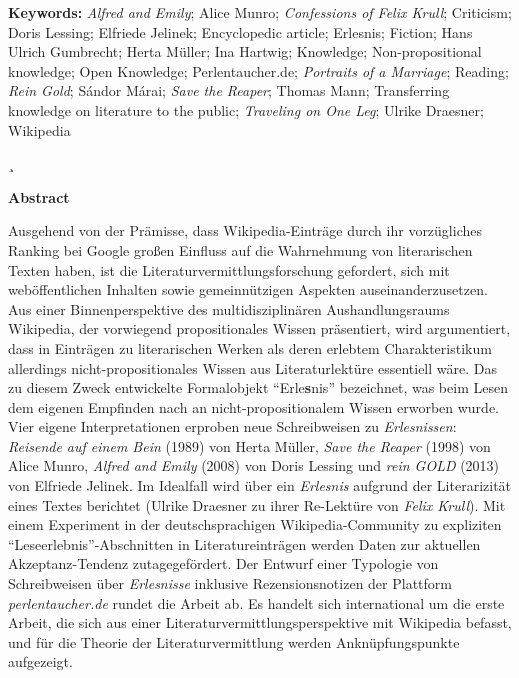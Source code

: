 \documentclass[fontsize=12pt]{scrartcl}
\begin{document}
\textbf{Keywords:} \textit{Alfred and Emily}; Alice Munro; \textit{Confessions of Felix Krull}; Criticism; Doris Lessing; Elfriede Jelinek; Encyclopedic article; Erlesnis; Fiction; Hans Ulrich Gumbrecht; Herta M\"uller; Ina Hartwig; Knowledge; Non-propositional know\-ledge; Open Knowledge; Per\-len\-tau\-cher.de; \textit{Portraits of a Marriage}; Reading; \textit{Rein Gold}; S\'{a}ndor M\'{a}rai; \textit{Save the Reaper}; Thomas Mann; Transferring know\-ledge on li\-te\-ra\-tur\-e to the public; \textit{Traveling on One Leg}; Ulrike Draesner; Wi\-ki\-pe\-dia

\newpage
\thispagestyle{empty}

¸\newline
\newline
\newline
\newline
\newline
\newline
\newline
\newline

\textbf{Abstract}

Ausgehend von der Pr\"amisse, dass Wi\-ki\-pe\-dia-Eintr\"age durch ihr vorz\"ugliches Ran\-king bei Google gro{\ss}en Einfluss auf die Wahrnehmung von li\-te\-ra\-rischen Texten haben, ist die Li\-te\-ra\-tur\-ver\-mitt\-lungsfor\-schung gefordert, sich mit web\"of\-fent\-lichen Inhalten sowie gemeinn\"utzigen Aspekten auseinanderzusetzen. Aus einer Binnenperspektive des multidisziplin\"aren Aushandlungsraums Wi\-ki\-pe\-dia, der vorwiegend pro\-po\-si\-ti\-o\-na\-les Wissen pr\"asentiert, wird argumentiert, dass in Eintr\"agen zu li\-te\-ra\-rischen Werken als deren erlebtem Charakteristikum al\-ler\-dings nicht-pro\-po\-si\-ti\-o\-na\-les Wissen aus Li\-te\-ra\-tur\-lekt\"ure essentiell w\"are. Das zu diesem Zweck ent\-wickelte Formalobjekt "`Erle\textbf{s}nis"' be\-zeichnet, was beim Lesen dem eigenen Empfinden nach an nicht-pro\-po\-si\-ti\-o\-na\-lem Wissen erworben wurde. \mbox{Vier} eigene Interpretationen erproben neue Schreibweisen zu \textit{Erlesnissen}: \textit{Reisende auf einem Bein} (1989) von Herta M\"uller, \textit{Save the Reaper} (1998) von Alice Munro, \textit{Alfred and Emily} (2008) von Doris Lessing und \textit{rein GOLD} (2013) von Elfriede Jelinek. Im Idealfall wird \"uber ein \textit{Erlesnis} aufgrund der Literarizit\"at eines Textes berichtet (Ulrike Draesner zu ihrer Re-Lekt\"ure von \textit{Felix Krull}). Mit einem Experiment in der deutschspra\-chi\-gen Wi\-ki\-pe\-dia-Community zu expliziten "`Leseerlebnis"'-Abschnitten in Li\-te\-ra\-tur\-eintr\"agen werden Daten zur aktuellen Akzeptanz-Tendenz zutagegef\"ordert. Der Entwurf einer Typologie von Schreibweisen \"uber \textit{Erlesnisse} inklusive Rezensionsnotizen der Plattform \textit{per\-len\-tau\-cher.de} rundet die Arbeit ab. Es handelt sich international um die erste Arbeit, die sich aus einer Li\-te\-ra\-tur\-ver\-mitt\-lungsperspektive mit Wi\-ki\-pe\-dia befasst, und f\"ur die Theorie der Li\-te\-ra\-tur\-ver\-mitt\-lung werden Ankn\"upfungspunkte aufgezeigt.
\end{document}
